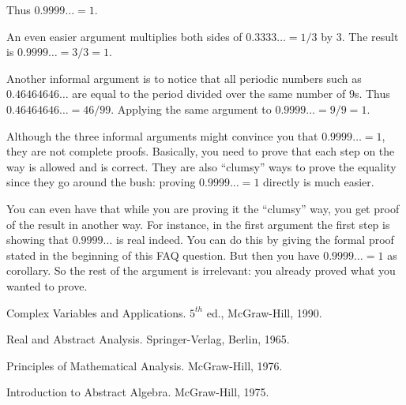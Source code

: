 Thus $0.9999\ldots = 1$.

An even easier argument multiplies both sides of $0.3333\ldots = 1/3$ by $3$.
The result is $0.9999\ldots = 3/3 = 1$.

Another informal argument is to notice that all periodic numbers
such as $0.46464646\ldots$ are equal to the period divided over the
same number of $9$s. Thus $0.46464646\ldots=46/99$. Applying the
same argument to $0.9999\ldots=9/9=1$.

Although the three informal arguments might convince you that $0.9999\ldots =
1$, they are not complete proofs. Basically, you need to prove that each step
on the way is allowed and is correct. They are also ``clumsy'' ways to prove
the equality since they go around the bush: proving $0.9999\ldots = 1$
directly is much easier.

You can even have that  while you are proving it the ``clumsy'' way, you get
proof of the result in another way. For instance, in the first argument the
first step is showing that $0.9999\ldots$ is real indeed. You can do this by
giving the formal proof stated in the beginning of this FAQ question. But
then you have $0.9999\ldots = 1$ as corollary. So the rest of the argument is
irrelevant: you already proved what you wanted to prove.

\Ref

     {Complex Variables and Applications.}
     {$5^{th}$ ed., McGraw-Hill, 1990.}

     {Real and Abstract Analysis.}
     {Springer-Verlag, Berlin, 1965.}

     {Principles of Mathematical Analysis.}
     {McGraw-Hill, 1976.}

     {Introduction to Abstract Algebra.}
     {McGraw-Hill, 1975.}

